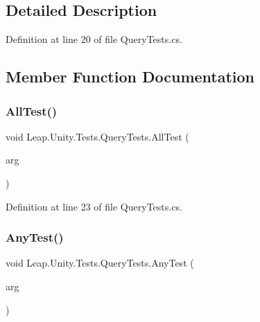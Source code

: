 \subsection{Detailed Description}


Definition at line 20 of file Query\+Tests.\+cs.



\subsection{Member Function Documentation}
\mbox{\label{class_leap_1_1_unity_1_1_tests_1_1_query_tests_a1c19b93c5718249f0a53a473c6180fb9}} 
\subsubsection{\texorpdfstring{AllTest()}{AllTest()}}
{\footnotesize\ttfamily void Leap.\+Unity.\+Tests.\+Query\+Tests.\+All\+Test (\begin{DoxyParamCaption}\item[{\mbox{[}\+Value\+Source(\char`\"{}list0\char`\"{})\mbox{]} \mbox{\hyperlink{class_leap_1_1_unity_1_1_tests_1_1_query_tests_1_1_query_arg}{Query\+Arg}}}]{arg }\end{DoxyParamCaption})}



Definition at line 23 of file Query\+Tests.\+cs.

\mbox{\label{class_leap_1_1_unity_1_1_tests_1_1_query_tests_abc698ee6c3cf73420bcc9d98f4ea35d5}} 
\subsubsection{\texorpdfstring{AnyTest()}{AnyTest()}}
{\footnotesize\ttfamily void Leap.\+Unity.\+Tests.\+Query\+Tests.\+Any\+Test (\begin{DoxyParamCaption}\item[{\mbox{[}\+Value\+Source(\char`\"{}list0\char`\"{})\mbox{]} \mbox{\hyperlink{class_leap_1_1_unity_1_1_tests_1_1_query_tests_1_1_query_arg}{Query\+Arg}}}]{arg }\end{DoxyParamCaption})}



